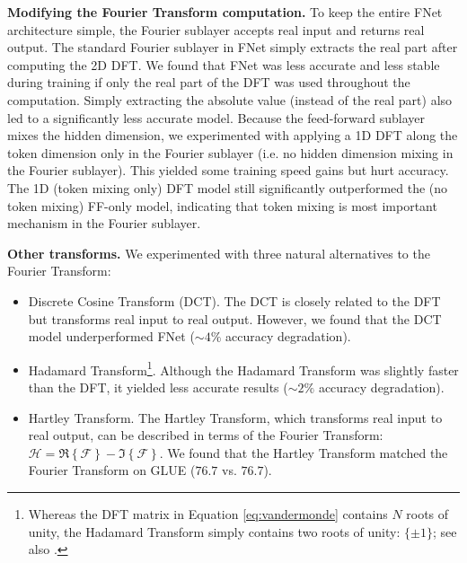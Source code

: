 \textbf{Modifying the Fourier Transform computation.} To keep the entire FNet architecture simple, the Fourier sublayer accepts real input and returns real output. The standard Fourier sublayer in FNet simply extracts the real part after computing the 2D DFT. We found that FNet was less accurate and less stable during training if only the real part of the DFT was used throughout the computation. Simply extracting the absolute value (instead of the real part) also led to a significantly less accurate model. Because the feed-forward sublayer mixes the hidden dimension, we experimented with  applying a 1D DFT along the token dimension only in the Fourier sublayer (i.e. no hidden dimension mixing in the Fourier sublayer). This yielded some training speed gains but hurt accuracy. The 1D (token mixing only) DFT model still significantly outperformed the (no token mixing) FF-only model, indicating that token mixing is most important mechanism in the Fourier sublayer.

\textbf{Other transforms.} We experimented with three natural alternatives to the Fourier Transform:
\begin{itemize}
    \item Discrete Cosine Transform (DCT). The DCT is closely related to the DFT but transforms real input to real output. However, we found that the DCT model underperformed FNet ($\sim4\%$ accuracy degradation).
    \item Hadamard Transform\footnote{Whereas the DFT matrix in Equation \eqref{eq:vandermonde} contains $N$ roots of unity, the Hadamard Transform simply contains two roots of unity: $\{\pm1\}$; see also \citet{kunz1979equivalence}.}. Although the Hadamard Transform was slightly faster than the DFT, it yielded less accurate results ($\sim2\%$ accuracy degradation).
    \item Hartley Transform. The Hartley Transform, which transforms real input to real output, can be described in terms of the Fourier Transform: $\mathcal{H} = \Re\left\{\mathcal{F}\right\} - \Im\left\{\mathcal{F}\right\}$. We found that the Hartley Transform matched the Fourier Transform on GLUE ($76.7$ vs. $76.7$). 
\end{itemize}

